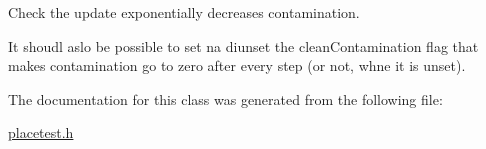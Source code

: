 Check the update exponentially decreases contamination. 

It shoudl aslo be possible to set na diunset the clean\+Contamination flag that makes contamination go to zero after every step (or not, whne it is unset). 

The documentation for this class was generated from the following file\+:\begin{DoxyCompactItemize}
\item 
\mbox{\hyperlink{placetest_8h}{placetest.\+h}}\end{DoxyCompactItemize}
